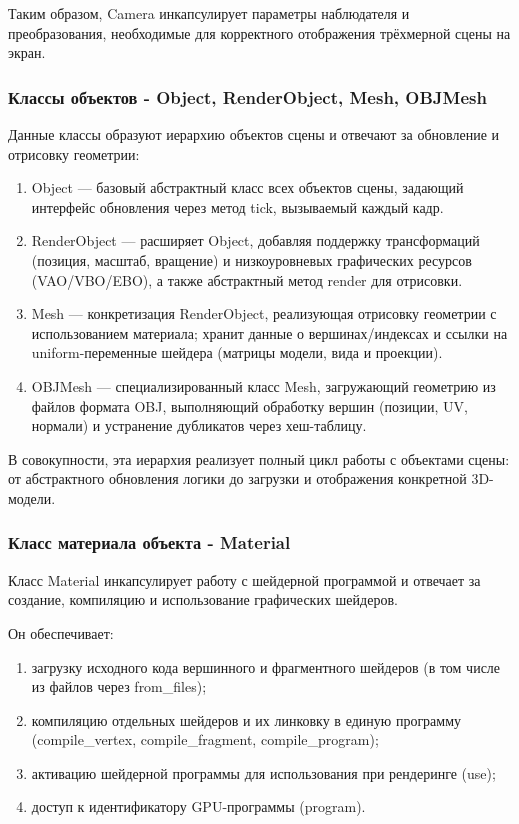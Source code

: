 \documentclass[a4paper,12pt]{article}
\begin{document}
Таким образом, Camera инкапсулирует параметры наблюдателя и преобразования, необходимые для корректного отображения трёхмерной сцены на экран.

\subsubsection* {Классы объектов - Object, RenderObject, Mesh, OBJMesh}
Данные классы образуют иерархию объектов сцены и отвечают за обновление и отрисовку геометрии:

\begin{enumerate}
    \item Object — базовый абстрактный класс всех объектов сцены, задающий интерфейс обновления через метод tick, вызываемый каждый кадр.
    \item RenderObject — расширяет Object, добавляя поддержку трансформаций (позиция, масштаб, вращение) и низкоуровневых графических ресурсов (VAO/VBO/EBO), а также абстрактный метод render для отрисовки.
    \item Mesh — конкретизация RenderObject, реализующая отрисовку геометрии с использованием материала; хранит данные о вершинах/индексах и ссылки на uniform-переменные шейдера (матрицы модели, вида и проекции).
    \item OBJMesh — специализированный класс Mesh, загружающий геометрию из файлов формата OBJ, выполняющий обработку вершин (позиции, UV, нормали) и устранение дубликатов через хеш-таблицу.
\end{enumerate}

В совокупности, эта иерархия реализует полный цикл работы с объектами сцены: от абстрактного обновления логики до загрузки и отображения конкретной 3D-модели.


\subsubsection*{Класс материала объекта - Material}
Класс Material инкапсулирует работу с шейдерной программой и отвечает за создание, компиляцию и использование графических шейдеров.

Он обеспечивает:

\begin{enumerate}
    \item загрузку исходного кода вершинного и фрагментного шейдеров (в том числе из файлов через from\_files);
    \item компиляцию отдельных шейдеров и их линковку в единую программу (compile\_vertex, compile\_fragment, compile\_program);
    \item активацию шейдерной программы для использования при рендеринге (use);
    \item доступ к идентификатору GPU-программы (program).
\end{enumerate}
\end{document}
